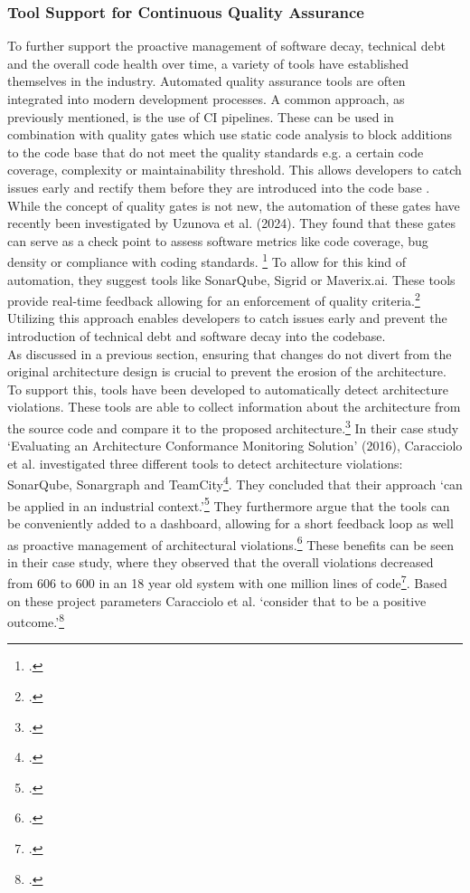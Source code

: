 \subsubsection{Tool Support for Continuous Quality Assurance}
To further support the proactive management of software decay, technical debt and the overall code health over time, a variety of tools have established themselves in the industry.
Automated quality assurance tools are often integrated into modern development processes. A common approach, as previously mentioned, is the use of \ac{CI} pipelines. These can be used in combination with quality gates which use static code analysis to block additions to the code base that do not meet the quality standards e.g. a 
certain code coverage, complexity or maintainability threshold. This allows developers to catch issues early and rectify them before they are introduced into the code base . While the concept of quality gates is not new, the automation of these gates have recently been investigated by Uzunova et al. (2024).
They found that these gates can serve as a check point to assess software metrics like code coverage, bug density or compliance with coding standards. \footcite[8]{uzunovaQualityGatesSoftware2024}
To allow for this kind of automation, they suggest tools like SonarQube, Sigrid or Maverix.ai. These tools provide real-time feedback allowing for an enforcement of quality criteria.\footcite[8]{uzunovaQualityGatesSoftware2024}\\
Utilizing this approach enables developers to catch issues early and prevent the introduction of technical debt and software decay into the codebase.\\

As discussed in a previous section, ensuring that changes do not divert from the original architecture design is crucial to prevent the erosion of the architecture.
To support this, tools have been developed to automatically detect architecture violations. These tools are able to collect information about the architecture from the source code
and compare it to the proposed architecture.\footcite[6]{thomasStaticDynamicArchitecture2017} In their case study 
`Evaluating an Architecture Conformance Monitoring Solution' (2016), Caracciolo et al. investigated three different tools to detect architecture violations:
SonarQube, Sonargraph and TeamCity\footcite[43]{caraccioloEvaluatingArchitectureConformance2016}. They concluded that their approach 
`can be applied in an industrial context.'\footcite[44]{caraccioloEvaluatingArchitectureConformance2016}
They furthermore argue that the tools can be conveniently added to a dashboard, allowing for a short feedback loop as well as proactive management of architectural violations.\footcite[44]{caraccioloEvaluatingArchitectureConformance2016}
These benefits can be seen in their case study, where they observed that the overall violations decreased from 606 to 600 in an 18 year old system with one million lines of code\footcite[43]{caraccioloEvaluatingArchitectureConformance2016}.
Based on these project parameters Caracciolo et al. `consider that to be a positive outcome.'\footcite[43]{caraccioloEvaluatingArchitectureConformance2016}\\

